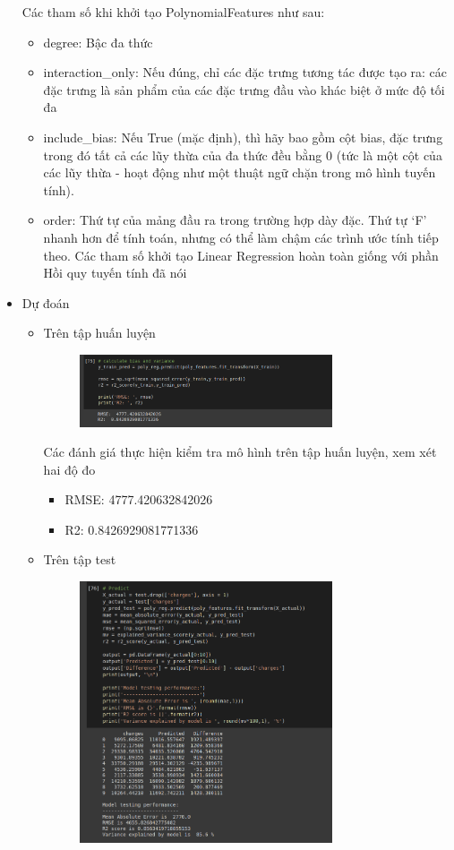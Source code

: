 \documentclass{article}
\begin{document}
\begin{itemize}
\begin{figure}[H]
		\end{figure}
	Các tham số khi khởi tạo PolynomialFeatures như sau:
	\begin{itemize}
		\item degree: Bậc đa thức
		\item interaction\_only: Nếu đúng, chỉ các đặc trưng tương tác được tạo ra: các đặc trưng là sản phẩm của các đặc trưng đầu vào khác biệt ở mức độ tối đa 
		\item include\_bias: Nếu True (mặc định), thì hãy bao gồm cột bias, đặc trưng trong đó tất cả các lũy thừa của đa thức đều bằng 0 (tức là một cột của các lũy thừa - hoạt động như một thuật ngữ chặn trong mô hình tuyến tính).
		\item order: Thứ tự của mảng đầu ra trong trường hợp dày đặc. Thứ tự ‘F’ nhanh hơn để tính toán, nhưng có thể làm chậm các trình ước tính tiếp theo.
	Các tham số khởi tạo Linear Regression hoàn toàn giống với phần Hồi quy tuyến tính đã nói
	\end{itemize}
		\item Dự đoán
		\begin{itemize}
			\item Trên tập huấn luyện
			\begin{figure}[H]
				\centering
				\includegraphics[width=0.75\textwidth]{images/polynomial_reg/poly_predict_train_set.png}
			\end{figure}
			Các đánh giá thực hiện kiểm tra mô hình trên tập huấn luyện, xem xét hai độ đo
			\begin{itemize}
				\item RMSE:  4777.420632842026
				\item R2:  0.8426929081771336
			\end{itemize}
			\item Trên tập test
			\begin{figure}[H]
				\centering
				\includegraphics[width=0.75\textwidth]{images/polynomial_reg/poly_predict_test_evaluation.png}

\end{figure}
\end{itemize}
\end{itemize}
\end{document}
